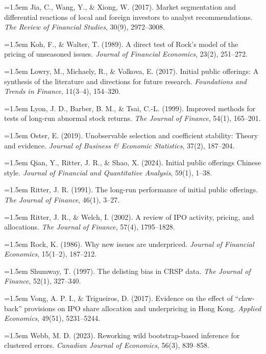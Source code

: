\documentclass[12pt,letterpaper]{article}
\begin{document}
\begin{singlespacing}
{\noindent\hangindent=1.5em Jia, C., Wang, Y., \& Xiong, W. (2017). Market segmentation and differential reactions of local and foreign investors to analyst recommendations. \textit{The Review of Financial Studies}, 30(9), 2972--3008.\par
\noindent\hangindent=1.5em Koh, F., \& Walter, T. (1989). A direct test of Rock's model of the pricing of unseasoned issues. \textit{Journal of Financial Economics}, 23(2), 251--272.\par
\noindent\hangindent=1.5em Lowry, M., Michaely, R., \& Volkova, E. (2017). Initial public offerings: A synthesis of the literature and directions for future research. \textit{Foundations and Trends in Finance}, 11(3--4), 154--320.\par
\noindent\hangindent=1.5em Lyon, J. D., Barber, B. M., \& Tsai, C.-L. (1999). Improved methods for tests of long-run abnormal stock returns. \textit{The Journal of Finance}, 54(1), 165--201.\par
\noindent\hangindent=1.5em Oster, E. (2019). Unobservable selection and coefficient stability: Theory and evidence. \textit{Journal of Business \& Economic Statistics}, 37(2), 187--204.\par
\noindent\hangindent=1.5em Qian, Y., Ritter, J. R., \& Shao, X. (2024). Initial public offerings Chinese style. \textit{Journal of Financial and Quantitative Analysis}, 59(1), 1--38.\par
\noindent\hangindent=1.5em Ritter, J. R. (1991). The long-run performance of initial public offerings. \textit{The Journal of Finance}, 46(1), 3--27.\par
\noindent\hangindent=1.5em Ritter, J. R., \& Welch, I. (2002). A review of IPO activity, pricing, and allocations. \textit{The Journal of Finance}, 57(4), 1795--1828.\par
\noindent\hangindent=1.5em Rock, K. (1986). Why new issues are underpriced. \textit{Journal of Financial Economics}, 15(1--2), 187--212.\par
\noindent\hangindent=1.5em Shumway, T. (1997). The delisting bias in CRSP data. \textit{The Journal of Finance}, 52(1), 327--340.\par
\noindent\hangindent=1.5em Vong, A. P. I., \& Trigueiros, D. (2017). Evidence on the effect of ``claw-back'' provisions on IPO share allocation and underpricing in Hong Kong. \textit{Applied Economics}, 49(51), 5231--5244.\par
\noindent\hangindent=1.5em Webb, M. D. (2023). Reworking wild bootstrap-based inference for clustered errors. \textit{Canadian Journal of Economics}, 56(3), 839--858.\par}
\end{singlespacing}
\end{document}
